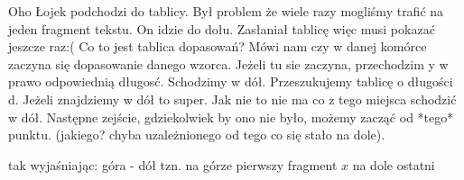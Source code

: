 Oho Łojek podchodzi do tablicy. Był problem że wiele razy mogliśmy trafić na jeden fragment tekstu. On idzie do dołu. 
Zasłaniał tablicę więc musi pokazać jeszcze raz:( Co to jest tablica dopasowań? Mówi nam czy w danej komórce zaczyna się dopasowanie danego wzorca. Jeżeli tu sie zaczyna, przechodzim y w prawo odpowiednią długosć. Schodzimy w dół. Przeszukujemy tablicę o długości d. Jeżeli znajdziemy w dół to super. Jak nie to nie ma co z tego miejsca schodzić w dół. Następne zejście, gdziekolwiek by ono nie było, możemy zacząć od *tego* punktu. (jakiego? chyba uzależnionego od tego co się stało na dole).

tak wyjaśniając: góra - dół tzn. na górze pierwszy fragment $x$ na dole ostatni

 

